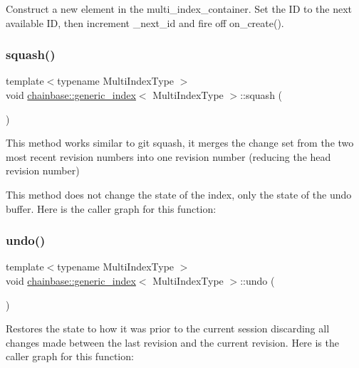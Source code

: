 Construct a new element in the multi\+\_\+index\+\_\+container. Set the ID to the next available ID, then increment \+\_\+next\+\_\+id and fire off on\+\_\+create(). \mbox{\label{classchainbase_1_1generic__index_a3ce42fec04c9d19c0f1c72f95e448bc3}} 
\subsubsection{\texorpdfstring{squash()}{squash()}}
{\footnotesize\ttfamily template$<$typename Multi\+Index\+Type $>$ \\
void \mbox{\hyperlink{classchainbase_1_1generic__index}{chainbase\+::generic\+\_\+index}}$<$ Multi\+Index\+Type $>$\+::squash (\begin{DoxyParamCaption}{ }\end{DoxyParamCaption})\hspace{0.3cm}{\ttfamily [inline]}}

This method works similar to git squash, it merges the change set from the two most recent revision numbers into one revision number (reducing the head revision number)

This method does not change the state of the index, only the state of the undo buffer. Here is the caller graph for this function\+:
\mbox{\label{classchainbase_1_1generic__index_a7b8c6268b527bcf7d7b6428ed769d612}} 
\subsubsection{\texorpdfstring{undo()}{undo()}}
{\footnotesize\ttfamily template$<$typename Multi\+Index\+Type $>$ \\
void \mbox{\hyperlink{classchainbase_1_1generic__index}{chainbase\+::generic\+\_\+index}}$<$ Multi\+Index\+Type $>$\+::undo (\begin{DoxyParamCaption}{ }\end{DoxyParamCaption})\hspace{0.3cm}{\ttfamily [inline]}}

Restores the state to how it was prior to the current session discarding all changes made between the last revision and the current revision. Here is the caller graph for this function\+:
\mbox{\label{classchainbase_1_1generic__index_a63ac021eb91a0607ac3c28ebf92fb082}} 
